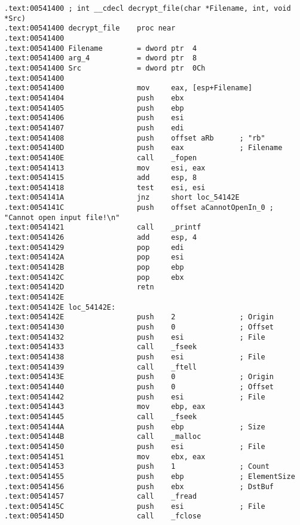 \begin{lstlisting}[style=customasm]
.text:00541400 ; int __cdecl decrypt_file(char *Filename, int, void *Src)
.text:00541400 decrypt_file    proc near
.text:00541400
.text:00541400 Filename        = dword ptr  4
.text:00541400 arg_4           = dword ptr  8
.text:00541400 Src             = dword ptr  0Ch
.text:00541400
.text:00541400                 mov     eax, [esp+Filename]
.text:00541404                 push    ebx
.text:00541405                 push    ebp
.text:00541406                 push    esi
.text:00541407                 push    edi
.text:00541408                 push    offset aRb      ; "rb"
.text:0054140D                 push    eax             ; Filename
.text:0054140E                 call    _fopen
.text:00541413                 mov     esi, eax
.text:00541415                 add     esp, 8
.text:00541418                 test    esi, esi
.text:0054141A                 jnz     short loc_54142E
.text:0054141C                 push    offset aCannotOpenIn_0 ; "Cannot open input file!\n"
.text:00541421                 call    _printf
.text:00541426                 add     esp, 4
.text:00541429                 pop     edi
.text:0054142A                 pop     esi
.text:0054142B                 pop     ebp
.text:0054142C                 pop     ebx
.text:0054142D                 retn
.text:0054142E
.text:0054142E loc_54142E:
.text:0054142E                 push    2               ; Origin
.text:00541430                 push    0               ; Offset
.text:00541432                 push    esi             ; File
.text:00541433                 call    _fseek
.text:00541438                 push    esi             ; File
.text:00541439                 call    _ftell
.text:0054143E                 push    0               ; Origin
.text:00541440                 push    0               ; Offset
.text:00541442                 push    esi             ; File
.text:00541443                 mov     ebp, eax
.text:00541445                 call    _fseek
.text:0054144A                 push    ebp             ; Size
.text:0054144B                 call    _malloc
.text:00541450                 push    esi             ; File
.text:00541451                 mov     ebx, eax
.text:00541453                 push    1               ; Count
.text:00541455                 push    ebp             ; ElementSize
.text:00541456                 push    ebx             ; DstBuf
.text:00541457                 call    _fread
.text:0054145C                 push    esi             ; File
.text:0054145D                 call    _fclose
\end{lstlisting}

